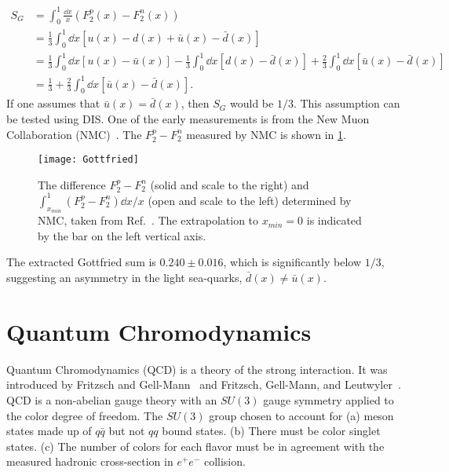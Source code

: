 \documentclass[../main.tex]{subfiles}
\begin{document}
\begin{equation}
	\begin{split}
		S_G & = \int_0^1 \frac{\dd{x}}{x}\left(F_2^{p}(x) - F_{2}^{n}(x)\right)                                     \\
		    & = \frac{1}{3} \int_0^1 \dd{x} \left[u\left(x\right) - d\left(x\right)
		+ \bar{u}\left(x\right) - \bar{d}\left(x\right)\right]                                                      \\
		    & = \frac{1}{3} \int_0^1 \dd{x} \left[u\left(x\right) - \bar{u}\left(x\right)\right]
		- \frac{1}{3} \int_0^1 \dd{x} \left[d\left(x\right) - \bar{d}\left(x\right)\right]
		+ \frac{2}{3} \int_0^1 \dd{x} \left[\bar{u}\left(x\right)-\bar{d}\left(x\right)\right]                      \\
		    & = \frac{1}{3} + \frac{2}{3} \int_0^1 \dd{x} \left[\bar{u}\left(x\right)-\bar{d}\left(x\right)\right].
	\end{split}
\end{equation}
If one assumes that $\bar{u}\left(x\right)= \bar{d}\left(x\right)$,
then $S_G$ would be $1/3$. This assumption can be tested using DIS.
One of the early measurements is from the New Muon Collaboration (NMC)~\cite{amaudruz1991}.
The $F_2^p-F_2^n$ measured by NMC is shown in \cref{fig:NMC_Gottfried}.
\begin{figure}[htbp!]
	\centering
	\texttt{[image: Gottfried]}
	\caption{The difference $F_2^p -F_2^n$ (solid and scale to the right) and
		$\int_{x_{min}}^1 (F_2^p-F_2^n)\dd{x}/x$ (open and scale to the left)
		determined by NMC, taken from Ref.~\cite{amaudruz1991}. The extrapolation
		to $x_{min}=0$ is indicated by the bar on the left vertical axis.}
	\label{fig:NMC_Gottfried}
\end{figure}
The extracted Gottfried sum is $0.240 \pm 0.016$, which is significantly below
$1/3$, suggesting an asymmetry in the light sea-quarks, $\bar{d}(x)\neq \bar{u}(x)$.

\section{Quantum Chromodynamics}
\label{sec:QCD}
Quantum Chromodynamics (QCD) is a theory of the strong interaction. It was
introduced by Fritzsch and Gell-Mann~\cite{fritzsch1972} and Fritzsch, Gell-Mann,
and Leutwyler~\cite{fritzsch1973}. QCD is a non-abelian gauge theory with an
$SU(3)$ gauge symmetry applied to the color degree of freedom. The $SU(3)$ group
chosen to account for (a) meson states made up of $q\bar{q}$ but not $qq$ bound states.
(b) There must be color singlet states. (c) The number of colors for each flavor
must be in agreement with the measured hadronic cross-section in $e^+ e^-$ collision.
\end{document}
